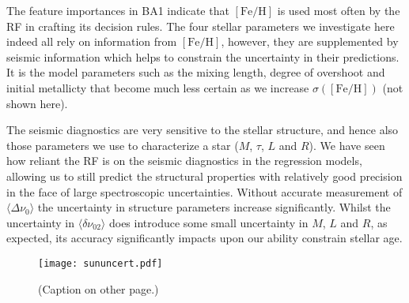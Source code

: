 The feature importances in BA1 indicate that ${[\text{Fe/H}]}$ is used most often by the RF in  crafting its decision rules.  The four stellar parameters we investigate here indeed all rely on information from ${[\text{Fe/H}]}$, however, they are supplemented by seismic information which helps to constrain the uncertainty in their predictions. It is the model parameters such as the mixing length, degree of overshoot and initial metallicty  that become much less certain as we increase ${\sigma([\text{Fe/H}])}$ (not shown here).  

 

The seismic diagnostics are very sensitive to the stellar structure, and hence also those  parameters we use to characterize a star ($M$, $\tau$, $L$ and $R$). We have seen how reliant the RF is on the seismic diagnostics in the  regression models, allowing us to still predict the structural properties with relatively good precision in the face of large spectroscopic uncertainties. Without accurate measurement of ${\langle\Delta\nu_0\rangle}$ the uncertainty in structure parameters increase significantly. Whilst the uncertainty in ${\langle\delta\nu_{02}\rangle}$ does introduce some small uncertainty in $M$, $L$ and $R$, as expected, its accuracy significantly impacts upon our ability constrain stellar age. 





%
%
%
\begin{landscape}
%
\begin{figure}
    \centering\vspace*{-0.75cm}
    \texttt{[image: sununcert.pdf]}
    \caption[Impact of uncertainties on predictions of mass, age, luminosity and radius]{(Caption on other page.) \label{fig:uncert1}}
\end{figure}
\end{landscape}
%
\begin{figure}
\end{figure}
%
%



